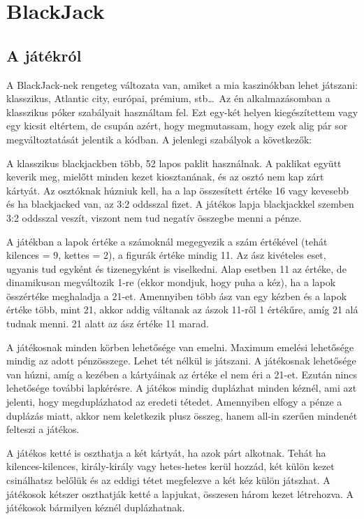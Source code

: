 \section{BlackJack}
\label{sec:p_blackjack}

\subsection{A játékról}

A BlackJack-nek rengeteg változata van, amiket a mia kaszinókban lehet játszani: klasszikus, Atlantic city, európai, prémium, stb\dots~Az én alkalmazásomban a klasszikus póker szabályait használtam fel. Ezt egy-két helyen kiegészítettem vagy egy kicsit eltértem, de csupán azért, hogy megmutassam, hogy ezek alig pár sor megváltoztatását jelentik a kódban. A jelenlegi szabályok a következők:

\bigskip

A klasszikus blackjackben több, 52 lapos paklit használnak. A paklikat együtt keverik meg, mielőtt minden kezet kiosztanának, és az osztó nem kap zárt kártyát. Az osztóknak húzniuk kell, ha a lap összesített értéke 16 vagy kevesebb és ha blackjacked van, az 3:2 oddsszal fizet.
A játékos lapja blackjackkel szemben 3:2 oddsszal veszít, viszont nem tud negatív összegbe menni a pénze.

A játékban a lapok értéke a számoknál megegyezik a szám értékével (tehát kilences = 9, kettes = 2), a figurák értéke mindig 11. Az ász kivételes eset, ugyanis tud egyként és tizenegyként is viselkedni. Alap esetben 11 az értéke, de dinamikusan megváltozik 1-re (ekkor mondjuk, hogy puha a kéz), ha a lapok összértéke meghaladja a 21-et. Amennyiben több ász van egy kézben és a lapok értéke több, mint 21, akkor addig váltanak az ászok 11-ről 1 értékűre, amíg 21 alá tudnak menni. 21 alatt az ász értéke 11 marad.

A játékosnak minden körben lehetősége van emelni. Maximum emelési lehetősége mindig az adott pénzösszege. Lehet tét nélkül is játszani. A játékosnak lehetősége van húzni, amíg a kezében a kártyáinak az értéke el nem éri a 21-et. Ezután nincs lehetősége további lapkérésre. A játékos mindig duplázhat minden kéznél, ami azt jelenti, hogy megduplázhatod az eredeti tétedet. Amennyiben elfogy a pénze a duplázás miatt, akkor nem keletkezik plusz összeg, hanem all-in szerűen mindenét felteszi a játékos. 

A játékos ketté is oszthatja a két kártyát, ha azok párt alkotnak. Tehát ha kilences-kilences, király-király vagy hetes-hetes kerül hozzád, két külön kezet csinálhatsz belőlük és az eddigi tétet megfelezve a két kéz külön játszhat. A játékosok kétszer oszthatják ketté a lapjukat, összesen három kezet létrehozva. A játékosok bármilyen kéznél duplázhatnak. 

